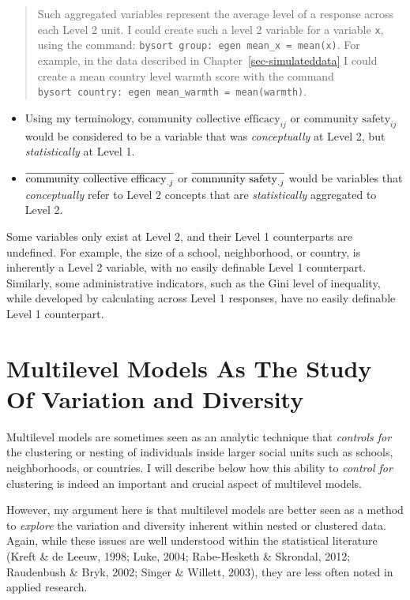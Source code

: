\documentclass[
  letterpaper,
  DIV=11,
  numbers=noendperiod]{scrreprt}
\begin{document}
\begin{quote}
Such aggregated variables represent the average level of a response
across each Level 2 unit. I could create such a level 2 variable for a
variable \texttt{x}, using the command:
\texttt{bysort\ group:\ egen\ mean\_x\ =\ mean(x)}. For example, in the
data described in Chapter~\ref{sec-simulateddata} I could create a mean
country level warmth score with the command
\texttt{bysort\ country:\ egen\ mean\_warmth\ =\ mean(warmth)}.
\end{quote}

\begin{itemize}
\item
  Using my terminology, \(\text{community collective efficacy}_{ij}\) or
  \(\text{community safety}_{ij}\) would be considered to be a variable
  that was \emph{conceptually} at Level 2, but \emph{statistically} at
  Level 1.
\item
  \(\color{black}\overline{\text{community collective efficacy}_{.j}}\)
  or \(\color{black}\overline{\text{community safety}_{.j}}\) would be
  variables that \emph{conceptually} refer to Level 2 concepts that are
  \emph{statistically} aggregated to Level 2.
\end{itemize}

Some variables only exist at Level 2, and their Level 1 counterparts are
undefined. For example, the size of a school, neighborhood, or country,
is inherently a Level 2 variable, with no easily definable Level 1
counterpart. Similarly, some administrative indicators, such as the Gini
level of inequality, while developed by calculating across Level 1
responses, have no easily definable Level 1 counterpart.

\section{Multilevel Models As The Study Of Variation and
Diversity}\label{sec-studyvariation}

Multilevel models are sometimes seen as an analytic technique that
\emph{controls for} the clustering or nesting of individuals inside
larger social units such as schools, neighborhoods, or countries. I will
describe below how this ability to \emph{control for} clustering is
indeed an important and crucial aspect of multilevel models.

However, my argument here is that multilevel models are better seen as a
method to \emph{explore} the variation and diversity inherent within
nested or clustered data. Again, while these issues are well understood
within the statistical literature (Kreft \& de Leeuw, 1998; Luke, 2004;
Rabe-Hesketh \& Skrondal, 2012; Raudenbush \& Bryk, 2002; Singer \&
Willett, 2003), they are less often noted in applied research.
\end{document}
